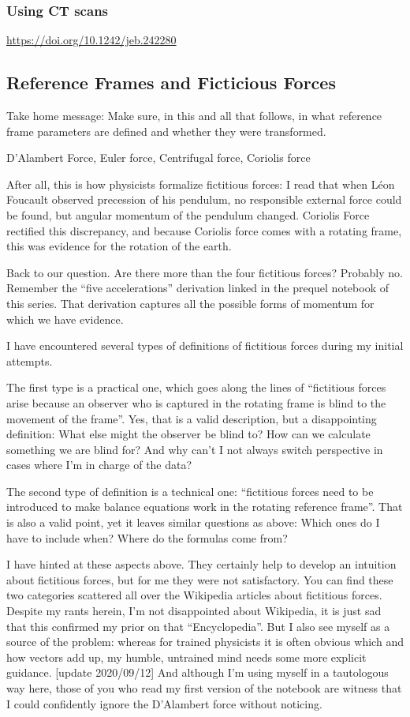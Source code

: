\subsubsection{Using CT scans}
\label{sec:orgc273ae7}
\citep{DuPlessis2013,Durston2022} \url{https://doi.org/10.1242/jeb.242280}

\subsection{Reference Frames and Ficticious Forces}
\label{sec:org274659f}
Take home message: Make sure, in this and all that follows, in what reference frame parameters are defined and whether they were transformed.

D’Alambert Force, Euler force, Centrifugal force, Coriolis force

After all, this is how physicists formalize fictitious forces: I read that when Léon Foucault observed precession of his pendulum, no responsible external force could be found, but angular momentum of the pendulum changed. Coriolis Force rectified this discrepancy, and because Coriolis force comes with a rotating frame, this was evidence for the rotation of the earth.

Back to our question. Are there more than the four fictitious forces? Probably no. Remember the “five accelerations” derivation linked in the prequel notebook of this series. That derivation captures all the possible forms of momentum for which we have evidence.


I have encountered several types of definitions of fictitious forces during my initial attempts.

The first type is a practical one, which goes along the lines of “fictitious forces arise because an observer who is captured in the rotating frame is blind to the movement of the frame”. Yes, that is a valid description, but a disappointing definition: What else might the observer be blind to? How can we calculate something we are blind for? And why can’t I not always switch perspective in cases where I’m in charge of the data?

The second type of definition is a technical one: “fictitious forces need to be introduced to make balance equations work in the rotating reference frame”. That is also a valid point, yet it leaves similar questions as above: Which ones do I have to include when? Where do the formulas come from?

I have hinted at these aspects above. They certainly help to develop an intuition about fictitious forces, but for me they were not satisfactory. You can find these two categories scattered all over the Wikipedia articles about fictitious forces. Despite my rants herein, I’m not disappointed about Wikipedia, it is just sad that this confirmed my prior on that “Encyclopedia”. But I also see myself as a source of the problem: whereas for trained physicists it is often obvious which and how vectors add up, my humble, untrained mind needs some more explicit guidance. [update 2020/09/12] And although I’m using myself in a tautologous way here, those of you who read my first version of the notebook are witness that I could confidently ignore the D’Alambert force without noticing.

